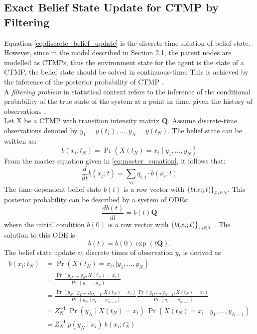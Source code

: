 \subsection{Exact Belief State Update for CTMP by Filtering}
\label{sec:filtering_CTMC}
Equation \ref{eq:discrete_belief_update} is the discrete-time solution of belief state. However, since in the model described in Section 2.1, the parent nodes are modelled as CTMPs, thus the environment state for the agent is the state of a CTMP, the belief state should be solved in continuous-time. This is achieved by the inference of the posterior probability of CTMP \cite{article}.\\
A \textit{filtering problem} in statistical context refers to the inference of the conditional probability of the true state of the system at a point in time, given the history of observations \cite{Godsill2019}.\\
Let X be a CTMP with transition intensity matrix \textbf{Q}. Assume discrete-time observations denoted by $ y_{1}=y(t_{1}), ..., y_{N}=y(t_{N}) $. The belief state can be written as:
\begin{equation}
b(x_{i};t_{N}) = \operatorname{Pr}(X(t_{N}) = x_{i} \mid y_{1}, ..., y_{N})
\end{equation}
From the master equation given in \autoref{eq:master_equation}, it follows that:
\begin{equation}
\frac{d}{dt} b(x_{j};t)  = \sum_{\forall i} q_{i,j} \cdot b(x_{i};t)
\end{equation}
The time-dependent belief state $ b(t) $ is a row vector with $ \left\lbrace b(x_{i};t)\right\rbrace_{x_{i} \in \rchi}  $.
This posterior probability can be described by a system of ODEs:
\begin{equation}
\frac{db(t)}{dt} = b(t)\textbf{Q}
\end{equation}
where the initial condition $ b(0) $ is a row vector with $ \left\lbrace b(x_{i};t)\right\rbrace_{x_{i} \in \rchi} $ \cite{article}. The solution to this ODE is
\begin{equation}
b(t) = b(0) \exp(t\textbf{Q}).
\label{eq:b_cont}
\end{equation}
The belief state update at discrete times of observation $ y_{t} $ is derived as 
\begin{align}
b(x_{i}; t_{N}) & = \operatorname{Pr}( X(t_{N}) = x_{i},\mid y_{1}, ..., y_{N}) \nonumber\\ & = \frac{\operatorname{Pr}(y_{1}, ..., y_{N}, X(t_{N}) = x_{i})}{\operatorname{Pr}(y_{1}, ..., y_{N})}  \nonumber\\ & = \frac{\operatorname{Pr}(y_{N} \mid y_{1}, ..., y_{N-1}, X(t_{N}) = x_{i})}{\operatorname{Pr}(y_{N} \mid y_{1}, ..., y_{N-1})} \frac{\operatorname{Pr}(y_{1}, ..., y_{N-1}, X(t_{N}) = x_{i})}{\operatorname{Pr}(y_{1}, ..., y_{N-1})}  \nonumber\\ & = Z_{N}^{-1} \ \operatorname{Pr}(y_{N} \mid X(t_{N})=x_{i})\ \operatorname{Pr}( X(t_{N}) = x_{i}\mid y_{1}, ..., y_{N-1})  \nonumber\\ & = Z_{N}^{-1}\ {p(y_{N} \mid x_{i})}\ {b(x_{i}; t_{N}^{-})}
\label{eq:b_jump}
\end{align}
